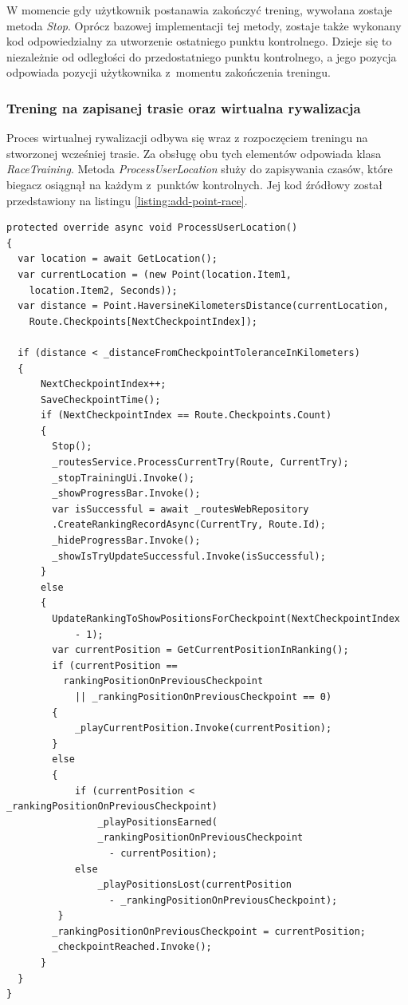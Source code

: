 W momencie gdy użytkownik postanawia zakończyć trening, wywołana zostaje metoda \textit{Stop}. Oprócz bazowej implementacji tej metody, zostaje także wykonany kod odpowiedzialny za utworzenie ostatniego punktu kontrolnego. Dzieje się to niezależnie od odległości do przedostatniego punktu kontrolnego, a jego pozycja odpowiada pozycji użytkownika z~momentu zakończenia treningu.

\subsubsection{Trening na zapisanej trasie oraz wirtualna rywalizacja}
Proces wirtualnej rywalizacji odbywa się wraz z rozpoczęciem treningu na stworzonej wcześniej trasie. Za obsługę obu tych elementów odpowiada klasa \textit{RaceTraining}. Metoda \textit{ProcessUserLocation} służy do zapisywania czasów, które biegacz osiągnął na każdym z~punktów kontrolnych. Jej kod źródłowy został przedstawiony na listingu \ref{listing:add-point-race}.
\begin{lstlisting}[caption={Proces wirtualnej rywalizacji},label=listing:add-point-race]
protected override async void ProcessUserLocation()
{
  var location = await GetLocation();
  var currentLocation = (new Point(location.Item1,
    location.Item2, Seconds));
  var distance = Point.HaversineKilometersDistance(currentLocation,
    Route.Checkpoints[NextCheckpointIndex]);

  if (distance < _distanceFromCheckpointToleranceInKilometers)
  {
      NextCheckpointIndex++;
      SaveCheckpointTime();
      if (NextCheckpointIndex == Route.Checkpoints.Count)
      {
        Stop();
        _routesService.ProcessCurrentTry(Route, CurrentTry);
        _stopTrainingUi.Invoke();
        _showProgressBar.Invoke();
        var isSuccessful = await _routesWebRepository
		.CreateRankingRecordAsync(CurrentTry, Route.Id);
        _hideProgressBar.Invoke();
        _showIsTryUpdateSuccessful.Invoke(isSuccessful);
      }
      else
      {
        UpdateRankingToShowPositionsForCheckpoint(NextCheckpointIndex
            - 1);
        var currentPosition = GetCurrentPositionInRanking();
        if (currentPosition == 
          rankingPositionOnPreviousCheckpoint
            || _rankingPositionOnPreviousCheckpoint == 0)
        {
            _playCurrentPosition.Invoke(currentPosition);
        }
        else
        {
            if (currentPosition < _rankingPositionOnPreviousCheckpoint)
                _playPositionsEarned(
                _rankingPositionOnPreviousCheckpoint
                  - currentPosition);
            else
                _playPositionsLost(currentPosition
                  - _rankingPositionOnPreviousCheckpoint);
         }
        _rankingPositionOnPreviousCheckpoint = currentPosition;
        _checkpointReached.Invoke();
      }
  }
}
\end{lstlisting}
